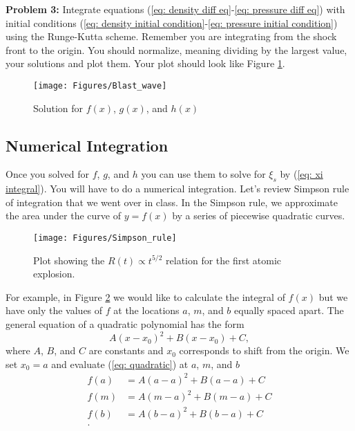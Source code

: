 \documentclass{article}
\begin{document}
\bigskip
\noindent
\textbf{Problem 3:} Integrate equations (\ref{eq: density diff eq}-\ref{eq: pressure diff eq}) with initial conditions (\ref{eq: density initial condition}-\ref{eq: pressure initial condition}) using the Runge-Kutta scheme. Remember you are integrating from the shock front to the origin. You should normalize, meaning dividing by the largest value, your solutions and plot them. Your plot should look like Figure \ref{fig: Blast wave solution}.
\begin{figure}[h!]
\begin{center}
\texttt{[image: Figures/Blast\_wave]}
\end{center}
\caption{Solution for $f(x)$, $g(x)$, and $h(x)$}
\label{fig: Blast wave solution}
\end{figure}

\subsection{Numerical Integration}
Once you solved for $f$, $g$, and $h$ you can use them to solve for $\xi_s$ by (\ref{eq: xi integral}). You will have to do a numerical integration. Let's review Simpson rule of integration that we went over in class. In the Simpson rule, we approximate the area under the curve of $y=f(x)$ by a series of piecewise quadratic curves.  
\begin{figure}[h!]
\begin{center}
\texttt{[image: Figures/Simpson\_rule]}
\end{center}
\caption{Plot showing the $R(t) \propto t^{5/2}$ relation for the first atomic explosion.}
\label{fig: simpson rule}
\end{figure}
For example, in Figure \ref{fig: simpson rule} we would like to calculate the integral of $f(x)$ but we have only the values of $f$ at the locations $a$, $m$, and $b$ equally spaced apart. The general equation of a quadratic polynomial has the form
\begin{equation}
\label{eq: quadratic}
A(x-x_0)^2+B(x-x_0)+C,
\end{equation}
where $A$, $B$, and $C$ are constants and $x_0$ corresponds to shift from the origin. We set $x_0=a$ and evaluate (\ref{eq: quadratic}) at $a$, $m$, and $b$
\begin{align*}
f(a) &= A(a-a)^2 + B(a-a) + C\\
f(m) &= A(m-a)^2 + B(m-a) + C\\
f(b) &= A(b-a)^2 + B(b-a) + C\\.
\end{align*}
\end{document}
